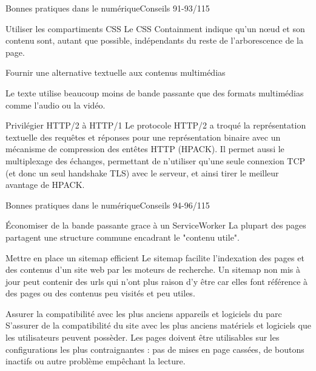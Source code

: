 \begin{frame}{Bonnes pratiques dans le numérique}{Conseils 91-93/115}
\begin{block}{Utiliser les compartiments CSS}
Le CSS Containment indique qu'un nœud et son contenu sont, autant que possible, indépendants du reste de l'arborescence de la page.
\end{block}

\begin{block}{Fournir une alternative textuelle aux contenus multimédias}

Le texte utilise beaucoup moins de bande passante que des formats multimédias comme l'audio ou la vidéo. 

\end{block}
\begin{block}{Privilégier HTTP/2 à HTTP/1}
Le protocole HTTP/2 a troqué la représentation textuelle des requêtes et réponses pour une représentation binaire avec un mécanisme de compression des entêtes HTTP (HPACK). Il permet aussi le multiplexage des échanges, permettant de n'utiliser qu'une seule connexion TCP (et donc un seul handshake TLS) avec le serveur, et ainsi tirer le meilleur avantage de HPACK.
\end{block}
\end{frame}



\begin{frame}{Bonnes pratiques dans le numérique}{Conseils 94-96/115}
\begin{block}{Économiser de la bande passante grace à un ServiceWorker}
La plupart des pages partagent une structure commune encadrant le "contenu utile". 
\end{block}

\begin{block}{Mettre en place un sitemap efficient}
Le sitemap facilite l'indexation des pages et des contenus d'un site web par les moteurs de recherche. Un sitemap non mis à jour peut contenir des urls qui n'ont plus raison d'y être car elles font référence à des pages ou des contenus peu visités et peu utiles. 
\end{block}

\begin{block}{Assurer la compatibilité avec les plus anciens appareils et logiciels du parc}
S'assurer de la compatibilité du site avec les plus anciens matériels et logiciels que les utilisateurs peuvent possèder. Les pages doivent être utilisables sur les configurations les plus contraignantes : pas de mises en page cassées, de boutons inactifs ou autre problème empêchant la lecture.
\end{block}

\end{frame}


